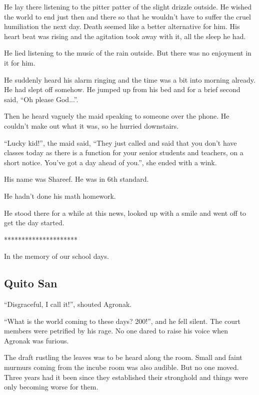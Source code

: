 \documentclass[twoside,11pt,titlepage]{article}
\begin{document}
He lay there listening to the pitter patter of the slight drizzle outside. He wished the world to end just then and there so that he wouldn't have to suffer the cruel humiliation the next day. Death seemed like a better alternative for him. His heart beat was rising and the agitation took away with it, all the sleep he had.

He lied listening to the music of the rain outside. But there was no enjoyment in it for him.

He suddenly heard his alarm ringing and the time was a bit into morning already. He had slept off somehow. He jumped up from his bed and for a brief second said, ``Oh please God...''.

Then he heard vaguely the maid speaking to someone over the phone. He couldn't make out what it was, so he hurried downstairs.

``Lucky kid!'', the maid said, ``They just called and said that you don't have classes today as there is a function for your senior students and teachers, on a short notice. You've got a day ahead of you.'', she ended with a wink.

His name was Shareef. He was in 6th standard.

He hadn't done his math homework.

He stood there for a while at this news, looked up with a smile and went off to get the day started.

\bigskip
\begin{center}
*********************
\end{center}

In the memory of our school days.

\newpage

\begin{center}
  \section{Quito San}
\end{center}
\bigskip
\bigskip
\bigskip

``Disgraceful, I call it!'', shouted Agronak.

``What is the world coming to these days? 200!'', and he fell silent. The court members were petrified by his rage. No one dared to raise his voice when Agronak was furious.

The draft rustling the leaves was to be heard along the room. Small and faint murmurs coming from the incube room was also audible. But no one moved. Three years had it been since they established their stronghold and things were only becoming worse for them.
\end{document}
